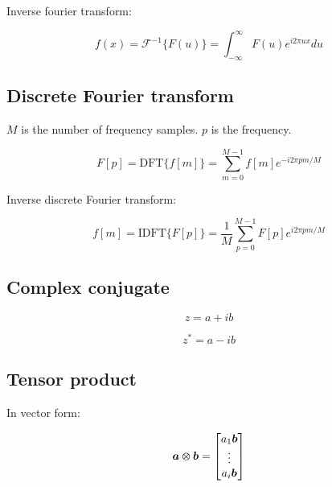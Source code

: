 Inverse fourier transform:

\begin{equation}\label{eq:inverse-fourier-transform-operations}
    f (x) = \mathcal{F}^{-1}\{F (u)\} = \int^{\infty}_{-\infty} F (u) e^{i 2 \pi u x} d u
\end{equation}


\subsection{Discrete Fourier transform}\label{subsec:discrete-fourier-transform-operations}

$M$ is the number of frequency samples. $p$ is the frequency.

\begin{equation}\label{eq:discrete-fourier-transform-operations}
    F [p] = \text{DFT} \{f [m] \} = \sum^{M-1}_{m=0} f [m] e^{- i 2 \pi p m / M}
\end{equation}

Inverse discrete Fourier transform:

\begin{equation}\label{eq:inverse-discrete-fourier-transform-operations}
    f [m] = \text{IDFT} \{F [p] \} = \frac{1}{M} \sum^{M-1}_{p=0} F [p] e^{i 2 \pi p m / M}
\end{equation}

\subsection{Complex conjugate}\label{subsec:complex-conjugate}

\begin{equation}\label{eq:non-complex-conjugate}
    z = a + i b
\end{equation}

\begin{equation}\label{eq:complex-conjugate}
    z^{*} = a - i b
\end{equation}


\subsection{Tensor product}\label{subsec:tensor-product}

In vector form:

\begin{equation}\label{eq:tensor-product-vector}
\bm{a} \varotimes \bm{b} =
\begin{bmatrix}
    a_1 \bm{b} \\
    \vdots \\
    a_i \bm{b}
\end{bmatrix}
\end{equation}

